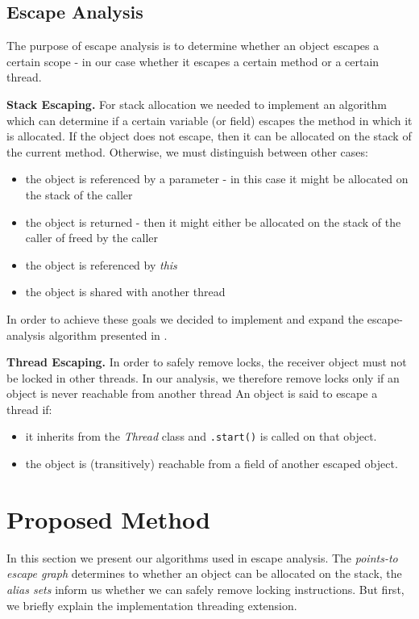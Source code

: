 \documentclass[letterpaper]{article}
\newcommand{\mypar}[1]{{\bf #1.}}
\begin{document}
\subsection{Escape Analysis}

The purpose of escape analysis is to determine whether an object escapes a certain
scope - in our case whether it escapes a certain method or a certain thread.

\mypar{Stack Escaping} For stack allocation we needed to implement an algorithm which can determine
if a certain variable (or field) escapes the method in which it is allocated. If the object does not
escape, then it can be allocated on the stack of the current method. Otherwise, we must distinguish between other cases:
\begin{itemize}
  \item the object is referenced by a parameter - in this case it might be allocated on the stack
  of the caller
  \item the object is returned - then it might either be allocated on the stack of the caller of freed
  by the caller
  \item the object is referenced by \textit{this}
  \item the object is shared with another thread
\end{itemize}
In order to achieve these goals we decided to implement and expand the escape-analysis algorithm presented
in \cite{Whaley:99}.

\mypar{Thread Escaping} In order to safely remove locks, the receiver object must
not be locked in other threads. In our analysis, we therefore remove locks only
if an object is never reachable from another thread  An object is said to
escape a thread if:

\begin{itemize}
  \item it inherits from the \textit{Thread} class and \texttt{.start()} is called on that object.
  \item the object is (transitively) reachable from a field of another escaped object.
\end{itemize}

\section{Proposed Method}\label{sec:yourmethod}

In this section we present our algorithms used in escape analysis.
The \emph{points-to escape graph} determines to whether an object can
be allocated on the stack, the \emph{alias sets} inform us whether we can
safely remove locking instructions. But first, we briefly explain the 
implementation threading extension.
\end{document}
